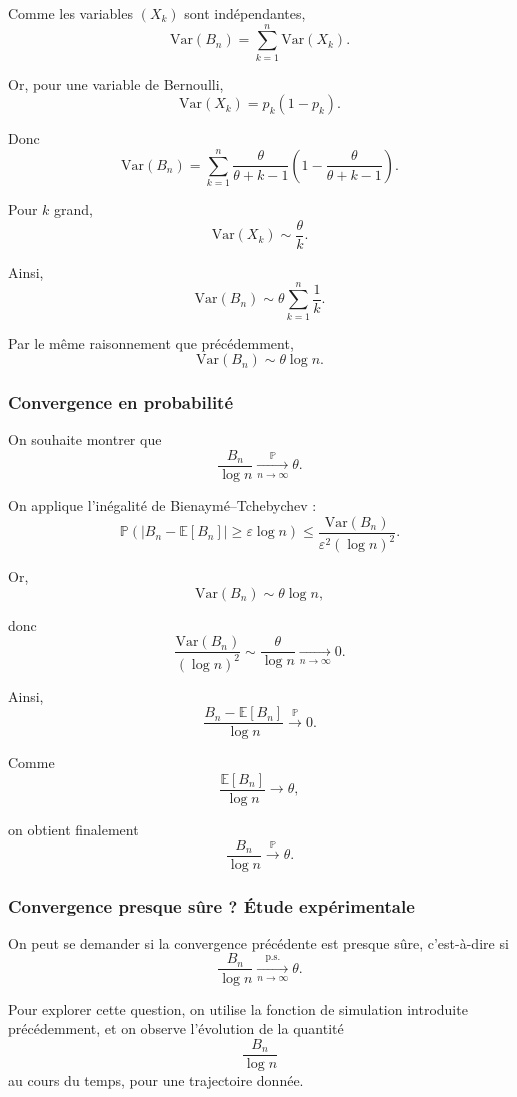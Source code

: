 \documentclass[12pt, a4paper]{article}
\theoremstyle{definition}
\theoremstyle{plain}
\begin{document}
Comme les variables $(X_k)$ sont indépendantes,
\[
\mathrm{Var}(B_n) = \sum_{k=1}^n \mathrm{Var}(X_k).
\]

Or, pour une variable de Bernoulli,
\[
\mathrm{Var}(X_k) = p_k (1 - p_k).
\]

Donc
\[
\mathrm{Var}(B_n) = \sum_{k=1}^n \frac{\theta}{\theta + k - 1} \left(1 - \frac{\theta}{\theta + k - 1}\right).
\]

Pour $k$ grand,
\[
\mathrm{Var}(X_k) \sim \frac{\theta}{k}.
\]

Ainsi,
\[
\mathrm{Var}(B_n) \sim \theta \sum_{k=1}^n \frac{1}{k}.
\]

Par le même raisonnement que précédemment,
\[
\mathrm{Var}(B_n) \sim \theta \log n.
\]

\subsubsection*{Convergence en probabilité}

On souhaite montrer que
\[
\frac{B_n}{\log n} \xrightarrow[n \to \infty]{\mathbb{P}} \theta.
\]

On applique l'inégalité de Bienaymé–Tchebychev :
\[
\mathbb{P}\left(\left| B_n - \mathbb{E}[B_n] \right| \geq \varepsilon \log n \right)
\leq \frac{\mathrm{Var}(B_n)}{\varepsilon^2 (\log n)^2}.
\]

Or,
\[
\mathrm{Var}(B_n) \sim \theta \log n,
\]

donc
\[
\frac{\mathrm{Var}(B_n)}{(\log n)^2} \sim \frac{\theta}{\log n} \xrightarrow[n \to \infty]{} 0.
\]

Ainsi,
\[
\frac{B_n - \mathbb{E}[B_n]}{\log n} \xrightarrow{\mathbb{P}} 0.
\]

Comme
\[
\frac{\mathbb{E}[B_n]}{\log n} \to \theta,
\]

on obtient finalement
\[
\frac{B_n}{\log n} \xrightarrow{\mathbb{P}} \theta.
\]
\subsubsection*{Convergence presque sûre ? Étude expérimentale}

On peut se demander si la convergence précédente est presque sûre, c’est-à-dire si
\[
\frac{B_n}{\log n} \xrightarrow[n \to \infty]{\text{p.s.}} \theta.
\]

Pour explorer cette question, on utilise la fonction de simulation introduite
précédemment, et on observe l’évolution de la quantité
\[
\frac{B_n}{\log n}
\]
au cours du temps, pour une trajectoire donnée.
\end{document}

